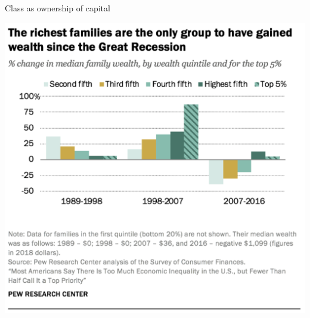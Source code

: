\documentclass{beamer}
\newcommand\bref[2]{\href{#1}{\color{blue}{#2}}}
\begin{document}
\begin{frame}{Class as ownership of capital}{\bref{https://www.pewresearch.org/social-trends/2020/01/09/trends-in-income-and-wealth-inequality/}{Pew Research Center}}

\includegraphics[height = .8\textheight]{pew_wealth}

\end{frame}
\end{document}

